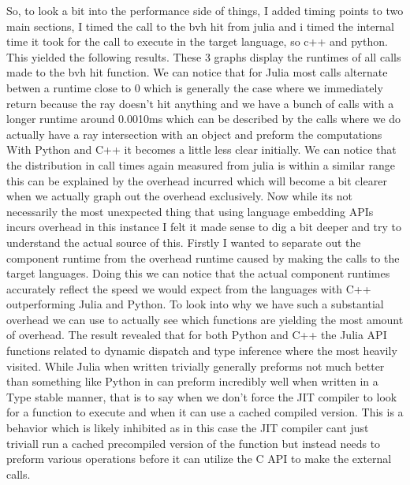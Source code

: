 {}\markdownRendererInterblockSeparator
{}So, to look a bit into the performance side of things, I added timing points to two main sections, I timed the call to the bvh hit from julia and i timed the internal time it took for the call to execute in the target language, so c++ and python. This yielded the following results.\markdownRendererInterblockSeparator
{}These 3 graphs display the runtimes of all calls made to the bvh hit function. We can notice that for Julia most calls alternate betwen a runtime close to 0 which is generally the case where we immediately return because the ray doesn't hit anything and we have a bunch of calls with a longer runtime around 0.0010ms which can be described by the calls where we do actually have a ray intersection with an object and preform the computations\markdownRendererInterblockSeparator
{}With Python and C++ it becomes a little less clear initially. We can notice that the distribution in call times again measured from julia is within a similar range this can be explained by the overhead incurred which will become a bit clearer when we actually graph out the overhead exclusively. \markdownRendererInterblockSeparator
{}\markdownRendererInterblockSeparator
{}Now while its not necessarily the most unexpected thing that using language embedding APIs incurs overhead in this instance I felt it made sense to dig a bit deeper and try to understand the actual source of this. Firstly I wanted to separate out the component runtime from the overhead runtime caused by making the calls to the target languages. \markdownRendererInterblockSeparator
{}Doing this we can notice that the actual component runtimes accurately reflect the speed we would expect from the languages with C++ outperforming Julia and Python. \markdownRendererInterblockSeparator
{}To look into why we have such a substantial overhead we can use  to actually see which functions are yielding the most amount of overhead. The result revealed that for both Python and C++ the Julia API functions related to dynamic dispatch and type inference where the most heavily visited. While Julia when written trivially generally preforms not much better than something like Python in can preform incredibly well when written in a Type stable manner, that is to say when we don't force the JIT compiler to look for a function to execute and when it can use a cached compiled version. This is a behavior which is likely inhibited as in this case the JIT compiler cant just triviall run a cached precompiled version of the function but instead needs to preform various operations before it can utilize the C API to make the external calls. \markdownRendererInterblockSeparator
